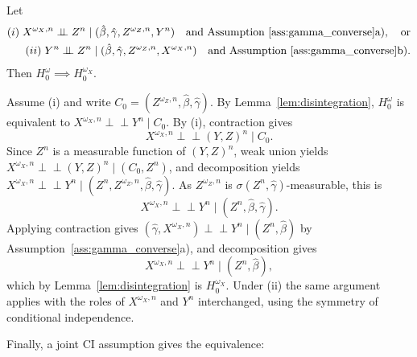\documentclass[twoside,11pt]{article}
\newcommand{\indep}{\perp \!\!\! \perp}
\begin{document}
\begin{theoremE}\label{thm:emb0_implies_text0_Z}
Let
\begin{align*}
(i)\; X^{\omega_X,n}\indep Z^n\mid (\hat\beta,\hat\gamma,Z^{\omega_Z,n},Y^n) \quad\text{and Assumption~\ref{ass:gamma_converse}a)},\quad\text{or}\\
(ii)\; Y^n\indep Z^n\mid (\hat\beta,\hat\gamma,Z^{\omega_Z,n},X^{\omega_X,n}) \quad\text{and Assumption~\ref{ass:gamma_converse}b)}.
\end{align*}
Then $H_0^\omega\implies H_0^{\omega_X}$.
\end{theoremE}
\begin{proofE}
Assume (i) and write $C_0=(Z^{\omega_Z,n},\hat\beta,\hat\gamma)$. By Lemma~\ref{lem:disintegration}, $H_0^\omega$ is equivalent to $X^{\omega_X,n}\indep Y^n\mid C_0$. By (i), contraction %
gives
\[
X^{\omega_X,n}\indep (Y,Z)^n\mid C_0 .
\]
Since $Z^n$ is a measurable function of $(Y,Z)^n$, weak union yields $X^{\omega_X,n}\indep (Y,Z)^n\mid (C_0,Z^n)$, and decomposition yields $X^{\omega_X,n}\indep Y^n\mid (Z^n,Z^{\omega_Z,n},\hat\beta,\hat\gamma)$. As $Z^{\omega_Z,n}$ is $\sigma(Z^n,\hat\gamma)$-measurable, this is
\begin{equation}\label{eq:converse_intermediate}
X^{\omega_X,n}\indep Y^n\mid (Z^n,\hat\beta,\hat\gamma).
\end{equation}
Applying contraction %
gives $(\hat\gamma,X^{\omega_X,n})\indep Y^n\mid (Z^n,\hat\beta)$ by Assumption~\ref{ass:gamma_converse}a), and decomposition gives
\[
X^{\omega_X,n}\indep Y^n\mid (Z^n,\hat\beta),
\]
which by Lemma~\ref{lem:disintegration} is $H_0^{\omega_X}$. Under (ii) the same argument applies with the roles of $X^{\omega_X,n}$ and $Y^n$ interchanged, using the symmetry of conditional independence.
\end{proofE}

Finally, a joint CI assumption gives the equivalence:
\end{document}
